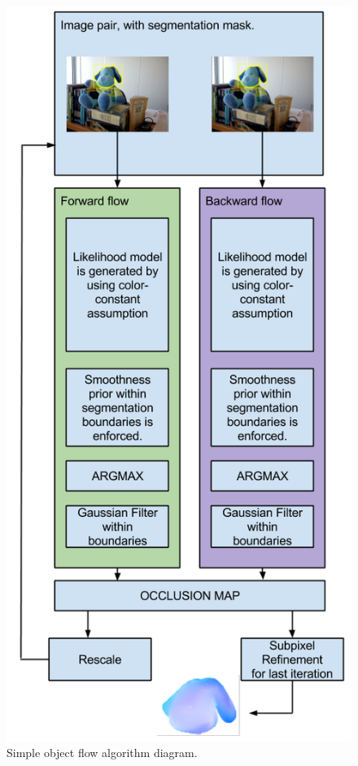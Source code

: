    \begin{figure}[thpb]
      \centering
      \includegraphics[height=1.0\textheight]{../images/simpleobjectflow.png}
      \caption{ Simple object flow algorithm diagram.}
      \label{sof_d}
   \end{figure}

